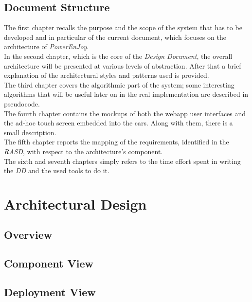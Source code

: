 \documentclass[11pt,a4paper]{report}
\begin{document}
\section{Document Structure}
The first chapter recalls the purpose and the scope of the system that has to be developed and in particular of the current document, which focuses on the architecture of \textit{PowerEnJoy}.\\
In the second chapter, which is the core of the \textit{Design Document},
the overall architecture will be presented at various levels of abstraction. After that a brief explanation of the architectural styles and patterns used is provided.\\
The third chapter covers the algorithmic part of the system; some interesting algorithms that will be useful later on in the real implementation are described in pseudocode.\\
The fourth chapter contains the mockups of both the webapp user interfaces and the ad-hoc touch screen embedded into the cars. Along with them, there is a small description.\\
The fifth chapter reports the mapping of the requirements, identified in the \textit{RASD}, with respect to the architecture's component.\\
The sixth and seventh chapters simply refers to the time effort spent in writing the \textit{DD} and the used tools to do it.
\chapter{Architectural Design}
\section{Overview}
\section{Component View}
\section{Deployment View}
\end{document}
